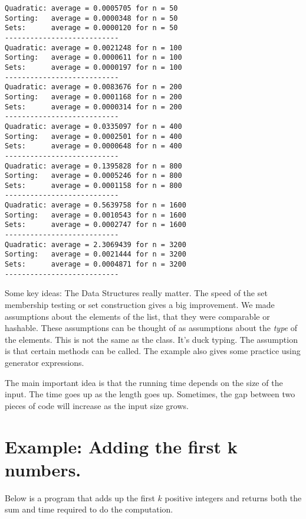 \begin{Verbatim}
Quadratic: average = 0.0005705 for n = 50
Sorting:   average = 0.0000348 for n = 50
Sets:      average = 0.0000120 for n = 50
---------------------------
Quadratic: average = 0.0021248 for n = 100
Sorting:   average = 0.0000611 for n = 100
Sets:      average = 0.0000197 for n = 100
---------------------------
Quadratic: average = 0.0083676 for n = 200
Sorting:   average = 0.0001168 for n = 200
Sets:      average = 0.0000314 for n = 200
---------------------------
Quadratic: average = 0.0335097 for n = 400
Sorting:   average = 0.0002501 for n = 400
Sets:      average = 0.0000648 for n = 400
---------------------------
Quadratic: average = 0.1395828 for n = 800
Sorting:   average = 0.0005246 for n = 800
Sets:      average = 0.0001158 for n = 800
---------------------------
Quadratic: average = 0.5639758 for n = 1600
Sorting:   average = 0.0010543 for n = 1600
Sets:      average = 0.0002747 for n = 1600
---------------------------
Quadratic: average = 2.3069439 for n = 3200
Sorting:   average = 0.0021444 for n = 3200
Sets:      average = 0.0004871 for n = 3200
---------------------------

\end{Verbatim}


Some key ideas:
The Data Structures really matter.  The speed of the set membership testing or set construction gives a big improvement.
We made assumptions about the elements of the list, that they were comparable or hashable.  These assumptions can be thought of as assumptions about the \emph{type} of the elements.  This is not the same as the class.  It's duck typing.  The assumption is that certain methods can be called.
The example also gives some practice using generator expressions.


The main important idea is that the running time depends on the size of the input.  The time goes up as the length goes up.
Sometimes, the gap between two pieces of code will increase as the input size grows.

\section{Example: Adding the first k numbers.}


Below is a program that adds up the first $k$ positive integers and returns both the sum and time required to do the computation.

